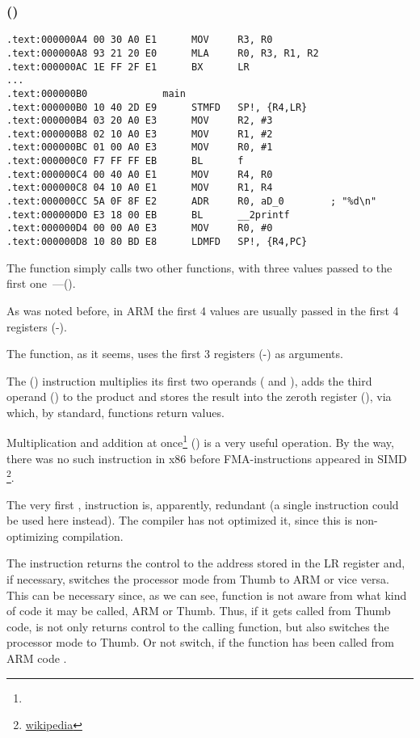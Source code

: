 \subsubsection{\NonOptimizingKeilVI (\ARMMode)}

\begin{lstlisting}
.text:000000A4 00 30 A0 E1      MOV     R3, R0
.text:000000A8 93 21 20 E0      MLA     R0, R3, R1, R2
.text:000000AC 1E FF 2F E1      BX      LR
...
.text:000000B0             main
.text:000000B0 10 40 2D E9      STMFD   SP!, {R4,LR}
.text:000000B4 03 20 A0 E3      MOV     R2, #3
.text:000000B8 02 10 A0 E3      MOV     R1, #2
.text:000000BC 01 00 A0 E3      MOV     R0, #1
.text:000000C0 F7 FF FF EB      BL      f
.text:000000C4 00 40 A0 E1      MOV     R4, R0
.text:000000C8 04 10 A0 E1      MOV     R1, R4
.text:000000CC 5A 0F 8F E2      ADR     R0, aD_0        ; "%d\n"
.text:000000D0 E3 18 00 EB      BL      __2printf
.text:000000D4 00 00 A0 E3      MOV     R0, #0
.text:000000D8 10 80 BD E8      LDMFD   SP!, {R4,PC}
\end{lstlisting}

The \main function simply calls two other functions, with three values passed to the 
first one~---(\ttf).

As was noted before, in ARM the first 4 values are usually passed in the first 4 registers (-).

The \ttf function, as it seems, uses the first 3 registers (-) as arguments.

The  () 
instruction multiplies its first two operands ( and ), adds the third operand () to the product and stores
the result into the zeroth register (), via which, by standard, functions return values.

Multiplication and addition at once\footnote{\WPMAO} () 
is a very useful operation. By the way, there was no such instruction in x86 
before FMA-instructions appeared in SIMD
\footnote{\href{http://go.yurichev.com/17103}{wikipedia}}.

The very first , 
instruction is, apparently, redundant (a single  instruction could be used here instead). 
The compiler has not optimized it, since this is non-optimizing compilation.


The  instruction returns the control to the address stored in the \ac{LR} register and, if necessary, 
switches the processor mode from Thumb to ARM or vice versa.
This can be necessary since, as we can see, function \ttf is not aware from what kind of code it may be
called, ARM or Thumb.
Thus, if it gets called from Thumb code, 
 is not only returns control to the calling function,
but also switches the processor mode to Thumb.
Or not switch, if the function has been called from ARM code .
